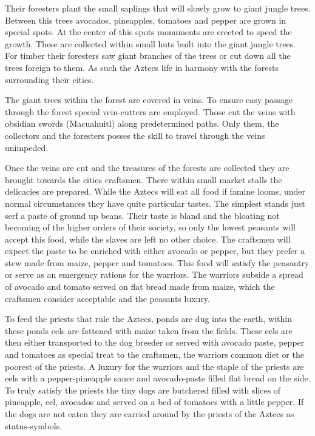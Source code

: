\documentclass[a4paper]{book}
\begin{document}
	Their foresters plant the small saplings that will slowly grow to giant jungle trees.
	Between this trees avocados, pineapples, tomatoes and pepper are grown in special spots.
	At the center of this spots monuments are erected to speed the growth.
	These are collected within small huts built into the giant jungle trees.
	For timber their foresters saw giant branches of the trees or cut down all the trees foreign to them.
	As such the \gls{Aztecs} life in harmony with the forests surrounding their cities.

	The giant trees within the forest are covered in veins.
	To ensure easy passage through the forest special vein-cutters are employed.
	Those cut the veins with obsidian swords (Macuahuitl) along predetermined paths.
	Only them, the collectors and the foresters posses the skill to travel through the veins unimpeded.

	Once the veins are cut and the treasures of the forests are collected they are
	brought towards the cities craftsmen.
	There within small market stalls the delicacies are prepared.
	While the \gls{Aztecs} will eat all food if famine looms,
	under normal circumstances they have quite particular tastes.
	The simplest stands just serf a paste of ground up beans.
	Their taste is bland and the bloating not becoming of the higher orders of their society,
	so only the lowest peasants will accept this food,
	while the slaves are left no other choice.
	The craftsmen will expect the paste to be enriched with either avocado or pepper,
	but they prefer a stew made from maize, pepper and tomatoes.
	This food will satisfy the peasantry or serve as an emergency rations for the warriors.
	The warriors subside a spread of avocado and tomato served on flat bread made from maize,
	which the craftsmen consider acceptable and the peasants luxury.

	To feed the priests that rule the \gls{Aztecs},
	ponds are dug into the earth,
	within these ponds eels are fattened with maize taken from the fields.
	These eels are then either transported to the dog breeder or
	served with avocado paste, pepper and tomatoes as special treat to the craftsmen,
	the warriors common diet or the poorest of the priests.
	A luxury for the warriors and the staple of the priests are eels with a pepper-pineapple sauce
	and avocado-paste filled flat bread on the side.
	To truly satisfy the priests the tiny dogs are butchered filled with slices of pineapple,
	eel, avocados and served on a bed of tomatoes with a little pepper.
	If the dogs are not eaten they are carried around by the priests of the \gls{Aztecs}
	as status-symbols.
\end{document}
